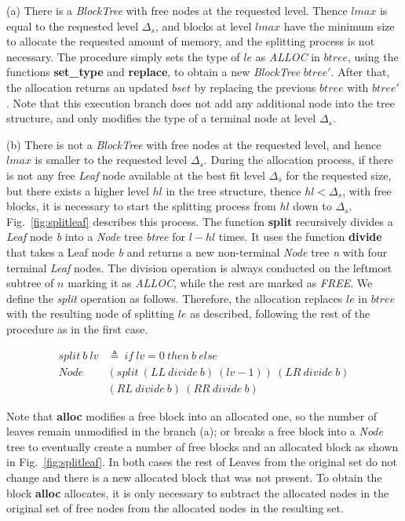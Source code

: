 (a) There is a \emph{BlockTree} with free nodes at the requested level. Thence $lmax$ is equal to the requested level $\Delta_s$, and blocks at level $lmax$ have the minimum size to allocate the requested amount of memory, and the splitting process is not necessary. The procedure simply sets the type of $le$ as \emph{ALLOC} in $btree$, using the functions \textbf{set\_type} and \textbf{replace}, to obtain a new \emph{BlockTree} $btree'$. After that, the allocation returns an updated $bset$ by replacing the previous $btree$ with $btree'$. Note that this execution branch does not add any additional node into the tree structure, and only modifies the type of a terminal node at level $\Delta_s$.

(b) There is not a \emph{BlockTree} with free nodes at the requested level, and hence $lmax$ is smaller to the requested level $\Delta_s$. During the allocation process, if there is not any free \emph{Leaf} node available at the best fit level $\Delta_s$ for the requested size, but there exists a higher level $hl$ in the tree structure, thence $hl < \Delta_s$, with free blocks, it is necessary to start the splitting process from $hl$ down to $\Delta_s$. Fig.~\ref{fig:splitleaf} describes this process. The function \textbf{split} recursively divides a \emph{Leaf} node \emph{b} into a \emph{Node} tree \emph{btree} for $l - hl$ times. It uses the function \textbf{divide} that takes a Leaf node \emph{b} and returns a new non-terminal \emph{Node} tree \emph{n} with four terminal \emph{Leaf} nodes. The division operation is always conducted on the leftmost subtree of $n$ marking it as \emph{ALLOC}, while the rest are marked as \emph{FREE}. We define the \emph{split} operation as follows. Therefore, the allocation replaces $le$ in $btree$ with the resulting node of splitting $le$ as described, following the rest of the procedure as in the first case.

\begin{definition} 
\begin{align*}
split\ b\ lv &\triangleq\ if\ lv = 0\ then\ b\ else\\
Node\ &(split\ (LL\ divide\ b)\ (lv - 1))\ (LR\ divide\ b)\\ 
&(RL\ divide\ b)\ (RR\ divide\ b)
\end{align*}
\end{definition}

Note that \textbf{alloc} modifies a free block into an allocated one, so the number of leaves remain unmodified in the branch (a); or breaks a free block into a \emph{Node} tree to eventually create a number of free blocks and an allocated block as shown in Fig.~\ref{fig:splitleaf}. In both cases the rest of Leaves from the original set do not change and there is a new allocated block that was not present. To obtain the block \textbf{alloc} allocates, it is only necessary to subtract the allocated nodes in the original set of free nodes from the allocated nodes in the resulting set.

